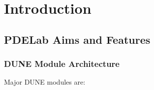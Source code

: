 \section{Introduction}

\subsection{PDELab Aims and Features}

\begin{frame}
\frametitle<presentation>{DUNE Module Architecture}
Major DUNE modules are:
\begin{center}
\end{center}
\end{frame}

